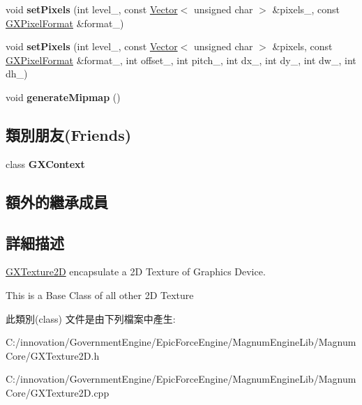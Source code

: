 \begin{DoxyCompactItemize}
\item 
void {\bfseries set\+Pixels} (int level\+\_\+, const \hyperlink{class_i_dream_sky_1_1_vector}{Vector}$<$ unsigned char $>$ \&pixels\+\_\+, const \hyperlink{class_i_dream_sky_1_1_g_x_pixel_format}{G\+X\+Pixel\+Format} \&format\+\_\+)\hypertarget{class_i_dream_sky_1_1_g_x_texture2_d_ad68cc89191504fd871cb42ff62e8f742}{}\label{class_i_dream_sky_1_1_g_x_texture2_d_ad68cc89191504fd871cb42ff62e8f742}

\item 
void {\bfseries set\+Pixels} (int level\+\_\+, const \hyperlink{class_i_dream_sky_1_1_vector}{Vector}$<$ unsigned char $>$ \&pixels, const \hyperlink{class_i_dream_sky_1_1_g_x_pixel_format}{G\+X\+Pixel\+Format} \&format\+\_\+, int offset\+\_\+, int pitch\+\_\+, int dx\+\_\+, int dy\+\_\+, int dw\+\_\+, int dh\+\_\+)\hypertarget{class_i_dream_sky_1_1_g_x_texture2_d_a14a329b40103ae368d9279a107ed706a}{}\label{class_i_dream_sky_1_1_g_x_texture2_d_a14a329b40103ae368d9279a107ed706a}

\item 
void {\bfseries generate\+Mipmap} ()\hypertarget{class_i_dream_sky_1_1_g_x_texture2_d_a8cebc2f0b6d211cafc9e3c66895138d0}{}\label{class_i_dream_sky_1_1_g_x_texture2_d_a8cebc2f0b6d211cafc9e3c66895138d0}

\end{DoxyCompactItemize}
\subsection*{類別朋友(Friends)}
\begin{DoxyCompactItemize}
\item 
class {\bfseries G\+X\+Context}\hypertarget{class_i_dream_sky_1_1_g_x_texture2_d_a2c36d7f8865080802bbad88cd73d871c}{}\label{class_i_dream_sky_1_1_g_x_texture2_d_a2c36d7f8865080802bbad88cd73d871c}

\end{DoxyCompactItemize}
\subsection*{額外的繼承成員}


\subsection{詳細描述}
\hyperlink{class_i_dream_sky_1_1_g_x_texture2_d}{G\+X\+Texture2D} encapsulate a 2D Texture of Graphics Device. 

This is a Base Class of all other 2D Texture 

此類別(class) 文件是由下列檔案中產生\+:\begin{DoxyCompactItemize}
\item 
C\+:/innovation/\+Government\+Engine/\+Epic\+Force\+Engine/\+Magnum\+Engine\+Lib/\+Magnum\+Core/G\+X\+Texture2\+D.\+h\item 
C\+:/innovation/\+Government\+Engine/\+Epic\+Force\+Engine/\+Magnum\+Engine\+Lib/\+Magnum\+Core/G\+X\+Texture2\+D.\+cpp\end{DoxyCompactItemize}
